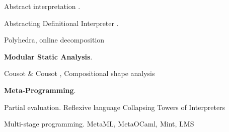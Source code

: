 Abstract interpretation \cite{DBLP:conf/popl/CousotC77}.

Abstracting Definitional Interpreter \cite{DBLP:journals/pacmpl/DaraisLNH17}.

Polyhedra, online decomposition

\textbf{Modular Static Analysis}. 

Cousot \& Cousot \cite{DBLP:conf/cc/CousotC02}, 
Compositional shape analysis \cite{DBLP:conf/popl/CalcagnoDOY09}

\textbf{Meta-Programming}.

Partial evaluation. 
Reflexive language \cite{DBLP:conf/gpce/Asai14}
Collapsing Towers of Interpreters \cite{Amin:2017:CTI:3177123.3158140}

Multi-stage programming. MetaML, MetaOCaml, Mint, LMS

